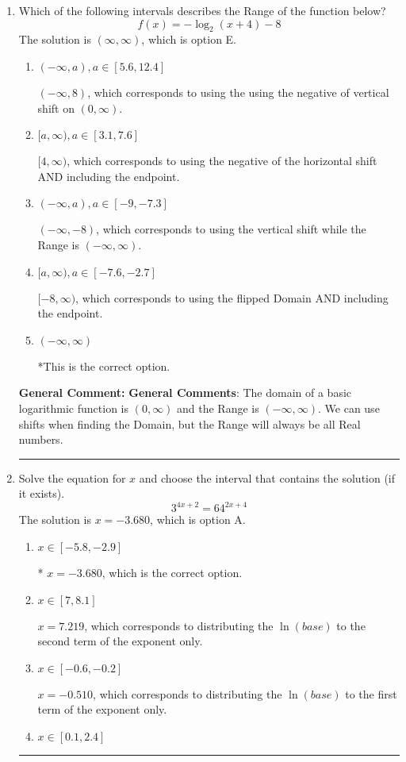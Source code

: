\documentclass{extbook}[14pt]
\newcommand{\litem}[1]{\item #1

\rule{\textwidth}{0.4pt}}
\begin{document}
\begin{enumerate}\litem{
Which of the following intervals describes the Range of the function below?
\[ f(x) = -\log_2{(x+4)}-8 \]The solution is \( (\infty, \infty) \), which is option E.\begin{enumerate}[label=\Alph*.]
\item \( (-\infty, a), a \in [5.6, 12.4] \)

$(-\infty, 8)$, which corresponds to using the using the negative of vertical shift on $(0, \infty)$.
\item \( [a, \infty), a \in [3.1, 7.6] \)

$[4, \infty)$, which corresponds to using the negative of the horizontal shift AND including the endpoint.
\item \( (-\infty, a), a \in [-9, -7.3] \)

$(-\infty, -8)$, which corresponds to using the vertical shift while the Range is $(-\infty, \infty)$.
\item \( [a, \infty), a \in [-7.6, -2.7] \)

$[-8, \infty)$, which corresponds to using the flipped Domain AND including the endpoint.
\item \( (-\infty, \infty) \)

*This is the correct option.
\end{enumerate}

\textbf{General Comment:} \textbf{General Comments}: The domain of a basic logarithmic function is $(0, \infty)$ and the Range is $(-\infty, \infty)$. We can use shifts when finding the Domain, but the Range will always be all Real numbers.
}
\litem{
Solve the equation for $x$ and choose the interval that contains the solution (if it exists).
\[ 3^{4x+2} = 64^{2x+4} \]The solution is \( x = -3.680 \), which is option A.\begin{enumerate}[label=\Alph*.]
\item \( x \in [-5.8, -2.9] \)

* $x = -3.680$, which is the correct option.
\item \( x \in [7, 8.1] \)

$x = 7.219$, which corresponds to distributing the $\ln(base)$ to the second term of the exponent only.
\item \( x \in [-0.6, -0.2] \)

$x = -0.510$, which corresponds to distributing the $\ln(base)$ to the first term of the exponent only.
\item \( x \in [0.1, 2.4] \)


\end{enumerate}}
\end{enumerate}
\end{document}
